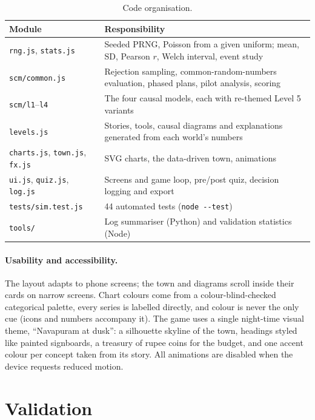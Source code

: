 \documentclass[11pt,a4paper]{article}
\begin{document}
\begin{table}[H]
\centering\small
\caption{Code organisation.}
\label{tab:modules}
\begin{tabularx}{\textwidth}{@{}P{4.3cm}L@{}}
\toprule
Module & Responsibility \\
\midrule
\texttt{rng.js}, \texttt{stats.js} & Seeded PRNG, Poisson from a given uniform; mean, SD, Pearson $r$, Welch interval, event study \\
\texttt{scm/common.js} & Rejection sampling, common-random-numbers evaluation, phased plans, pilot analysis, scoring \\
\texttt{scm/l1}--\texttt{l4} & The four causal models, each with re-themed Level 5 variants \\
\texttt{levels.js} & Stories, tools, causal diagrams and explanations generated from each world's numbers \\
\texttt{charts.js}, \texttt{town.js}, \texttt{fx.js} & SVG charts, the data-driven town, animations \\
\texttt{ui.js}, \texttt{quiz.js}, \texttt{log.js} & Screens and game loop, pre/post quiz, decision logging and export \\
\texttt{tests/sim.test.js} & 44 automated tests (\texttt{node -{}-test}) \\
\texttt{tools/} & Log summariser (Python) and validation statistics (Node) \\
\bottomrule
\end{tabularx}
\end{table}

\paragraph{Usability and accessibility.} The layout adapts to phone screens; the town and diagrams scroll inside their
cards on narrow screens. Chart colours come from a colour-blind-checked categorical palette, every series is labelled
directly, and colour is never the only cue (icons and numbers accompany it). The game uses a single night-time visual
theme, ``Navapuram at dusk'': a silhouette skyline of the town, headings styled like painted signboards, a treasury of
rupee coins for the budget, and one accent colour per concept taken from its story. All animations are disabled when the
device requests reduced motion.

\section{Validation}
\end{document}
